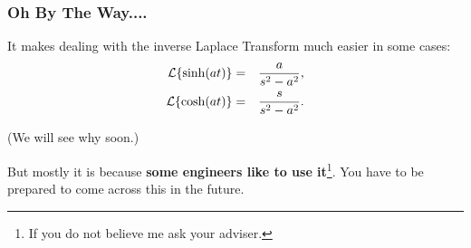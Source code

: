 \begin{frame}
  \frametitle{Oh By The Way....}

  It makes dealing with the inverse Laplace Transform much easier in some cases:
  \begin{eqnarray*}
    \laplace{\sinh(at)} & = & \frac{a}{s^2-a^2}, \\
    \laplace{\cosh(at)} & = & \frac{s}{s^2-a^2}.
  \end{eqnarray*}

  (We will see why soon.)

  But mostly it is because \textbf{some engineers like to use it}\footnote{If you do not believe me ask your adviser.}. You
  have to be prepared to come across this in the future.

  
\end{frame}



